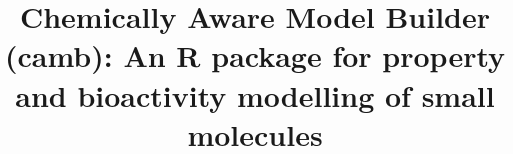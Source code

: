 \documentclass{bmcart}
\begin{document}
\begin{frontmatter}

\begin{fmbox}


\title{Chemically Aware Model Builder (camb): An R package for property and bioactivity modelling of small molecules}


\author[
   addressref={cambridge},                  
   noteref={n1},                        
]{ }	
\author[
   addressref={paris},
   noteref={n1}, 
]{ }
\author[
   addressref={ebi},
]{ }
\author[
   addressref={unilever},
]{ }
\author[
   addressref={cambridge},
   noteref={n2},
]{ }
\author[
   addressref={paris},
   noteref={n2},
]{ }
\author[
   addressref={cambridge},
   noteref={n2},
]{ }


\address[id=cambridge]{
  , 
  ,                     
  ,                         
  ,                             
}


\end{fmbox}
\end{frontmatter}
\end{document}

